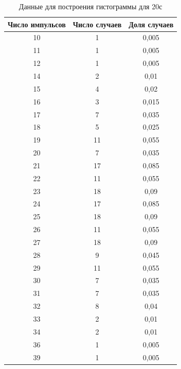 \documentclass{article}
\begin{document}
\begin{table}[!h]
    \centering
    \begin{tabular}{|c|c|c|}
        \hline
         Число импульсов & Число случаев & Доля случаев \\
         \hline
        10 & 1 & 0,005 \\
        11 & 1 & 0,005 \\
        12 & 1 & 0,005 \\
        14 & 2 & 0,01 \\
        15 & 4 & 0,02 \\
        16 & 3 & 0,015 \\
        17 & 7 & 0,035 \\
        18 & 5 & 0,025 \\
        19 & 11 & 0,055 \\
        20 & 7 & 0,035 \\
        21 & 17 & 0,085 \\
        22 & 11 & 0,055 \\
        23 & 18 & 0,09 \\
        24 & 17 & 0,085 \\
        25 & 18 & 0,09 \\
        26 & 11 & 0,055 \\
        27 & 18 & 0,09 \\
        28 & 9 & 0,045 \\
        29 & 11 & 0,055 \\
        30 & 7 & 0,035 \\
        31 & 7 & 0,035 \\
        32 & 8 & 0,04 \\
        33 & 2 & 0,01 \\
        34 & 2 & 0,01 \\
        36 & 1 & 0,005 \\
        39 & 1 & 0,005 \\
        \hline
    \end{tabular}
    \caption{Данные для построения гистограммы для 20с}
\end{table}
\end{document}

